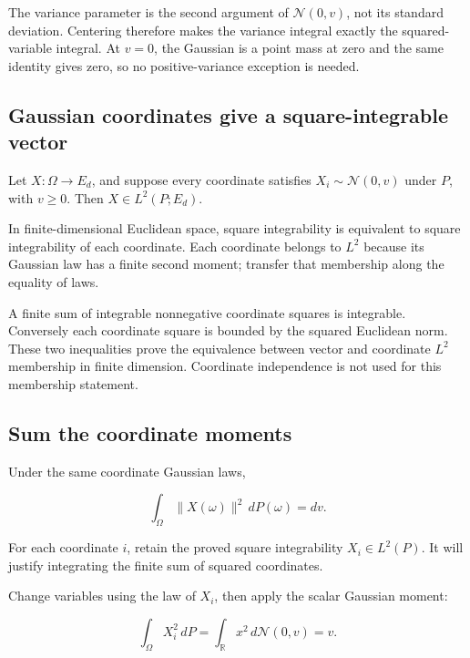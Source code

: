 \documentclass[11pt,a4paper]{report}
\begin{document}
The variance parameter is the second argument of \(\mathcal N(0,v)\), not its standard deviation. Centering therefore makes the variance integral exactly the squared-variable integral. At \(v=0\), the Gaussian is a point mass at zero and the same identity gives zero, so no positive-variance exception is needed.

\subsection{\texorpdfstring{Gaussian coordinates give a square-integrable vector}{Gaussian coordinates give a square-integrable vector}}
\label{report-step-UnadjustedLangevin-GaussianMoments-lean-2}


Let \(X:\Omega\to E_d\), and suppose every coordinate satisfies \(X_i\sim\mathcal N(0,v)\) under \(P\), with \(v\ge0\). Then \(X\in L^2(P;E_d)\).



In finite-dimensional Euclidean space, square integrability is equivalent to square integrability of each coordinate. Each coordinate belongs to \(L^2\) because its Gaussian law has a finite second moment; transfer that membership along the equality of laws.



A finite sum of integrable nonnegative coordinate squares is integrable. Conversely each coordinate square is bounded by the squared Euclidean norm. These two inequalities prove the equivalence between vector and coordinate \(L^2\) membership in finite dimension. Coordinate independence is not used for this membership statement.

\subsection{\texorpdfstring{Sum the coordinate moments}{Sum the coordinate moments}}
\label{report-step-UnadjustedLangevin-GaussianMoments-lean-3}


Under the same coordinate Gaussian laws,

\[\int_\Omega\|X(\omega)\|^2\,dP(\omega)=dv.\]

For each coordinate \(i\), retain the proved square integrability \(X_i\in L^2(P)\). It will justify integrating the finite sum of squared coordinates.



Change variables using the law of \(X_i\), then apply the scalar Gaussian moment:

\[\int_\Omega X_i^2\,dP=\int_{\mathbb R}x^2\,d\mathcal N(0,v)=v.\]
\end{document}
